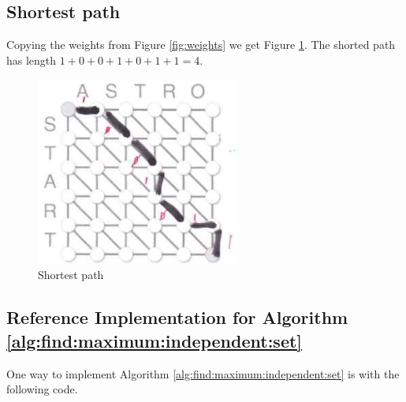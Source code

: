 \documentclass[]{article}
\begin{document}
\subsection{Shortest path}

Copying the weights from Figure \ref{fig:weights} we get Figure \ref{fig:Shortest:path}. The shorted path has length $1+0+0+1+0+1+1=4$. 
\begin{figure}[H]
	\begin{center}
		\caption{Shortest path}\label{fig:Shortest:path}
		\includegraphics[width=0.6\textwidth]{q2-path}
	\end{center}
\end{figure}



%
%

\begin{appendices}
	\section{Reference Implementation for Algorithm \ref{alg:find:maximum:independent:set}}\label{sect:ref:implementation}
	One way to implement Algorithm \ref{alg:find:maximum:independent:set} is with the following code.
	
\end{appendices}
\end{document}
